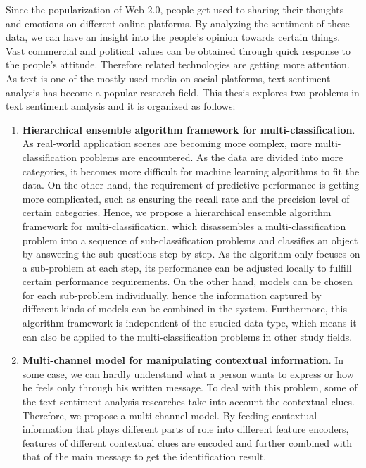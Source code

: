 
\begin{eabstract}

Since the popularization of Web 2.0, people get used to sharing their thoughts and emotions on different online platforms. By analyzing the sentiment of these data, we can have an insight into the people's opinion towards certain things. Vast commercial and political values can be obtained through quick response to the people's attitude. Therefore related technologies are getting more attention. As text is one of the mostly used media on social platforms, text sentiment analysis has become a popular research field. This thesis explores two problems in text sentiment analysis and it is organized as follows:

\begin{enumerate}

\item {\bf Hierarchical ensemble algorithm framework for multi-classification}. As real-world application scenes are becoming more complex, more multi-classification problems are encountered. As the data are divided into more categories, it becomes more difficult for machine learning algorithms to fit the data. On the other hand, the requirement of predictive performance is getting more complicated, such as ensuring the recall rate and the precision level of certain categories. Hence, we propose a hierarchical ensemble algorithm framework for multi-classification, which disassembles a multi-classification problem into a sequence of sub-classification problems and classifies an object by answering the sub-questions step by step. As the algorithm only focuses on a sub-problem at each step, its performance can be adjusted locally to fulfill certain performance requirements. On the other hand, models can be chosen for each sub-problem individually, hence the information captured by different kinds of models can be combined in the system. Furthermore, this algorithm framework is independent of the studied data type, which means it can also be applied to the multi-classification problems in other study fields.

\item {\bf Multi-channel model for manipulating contextual information}. In some case, we can hardly understand what a person wants to express or how he feels only through his written message. To deal with this problem, some of the text sentiment analysis researches take into account the contextual clues. Therefore, we propose a multi-channel model. By feeding contextual information that plays different parts of role into different feature encoders, features of different contextual clues are encoded and further combined with that of the main message to get the identification result.


\end{enumerate}
\end{eabstract}
